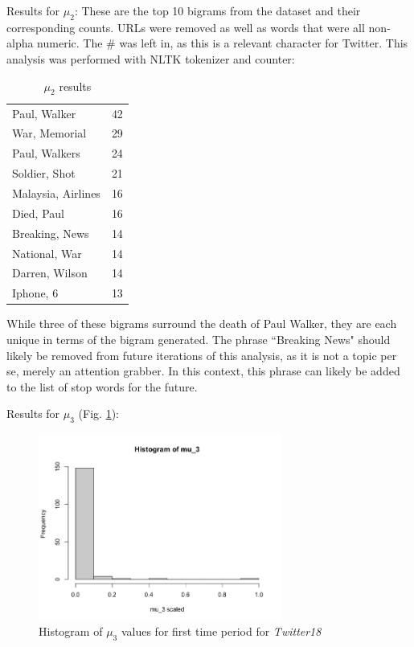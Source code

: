 \documentclass[preprint,review,12pt]{elsarticle}
\begin{document}
Results for $\mu_2$:
These are the top 10 bigrams from the dataset and their corresponding counts. URLs were removed as well as words that were all non-alpha numeric. The \# was left in, as this is a relevant character for Twitter. This analysis was performed with NLTK tokenizer and counter:

\begin{table}[h]
    \centering
    \begin{tabular}{|p{4cm}|p{2cm}|}
    \hline
         Paul, Walker & 42 \\
         War, Memorial & 29 \\
         Paul, Walkers & 24 \\
         Soldier, Shot & 21 \\
         Malaysia, Airlines & 16 \\
         Died, Paul & 16 \\
         Breaking, News & 14 \\
         National, War & 14 \\
         Darren, Wilson & 14 \\
         Iphone, 6 & 13 \\
    \hline
    \end{tabular}
    \caption{$\mu_2$ results}
    \label{tab:mu_2 results}
\end{table}

While three of these bigrams surround the death of Paul Walker, they are each unique in terms of the bigram generated. The phrase ``Breaking News" should likely be removed from future iterations of this analysis, as it is not a topic per se, merely an attention grabber. In this context, this phrase can likely be added to the list of stop words for the future.

Results for $\mu_3$ (Fig. \ref{fig:Hist mu_3 Twitter18}):
\begin{figure}[h!]
    \centering
    \includegraphics[width=8cm]{histogram_mu_3_scaled.png}
    \caption{Histogram of $\mu_3$ values for first time period for \textit{Twitter18}}
    \label{fig:Hist mu_3 Twitter18}
\end{figure}
\end{document}
